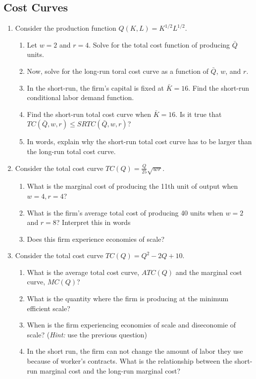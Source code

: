 \documentclass[11pt]{article}
\begin{document}
\subsection*{Cost Curves}
\begin{enumerate}
  \item Consider the production function $Q(K, L) = K^{1/2}L^{1/2}$.
  \begin{enumerate}
    \item Let $w = 2$ and $r = 4$. Solve for the total cost function of producing $\bar{Q}$ units.
    
    \item Now, solve for the long-run toral cost curve as a function of $\bar{Q}$, $w$, and $r$.
    
    \item In the short-run, the firm's capital is fixed at $\bar{K} = 16$. Find the short-run conditional labor demand function. 
    
    \item Find the short-run total cost curve when $\bar{K} = 16$. Is it true that $TC(\bar{Q}, w, r) \leq SRTC(\bar{Q}, w, r)$?
    
    \item In words, explain why the short-run total cost curve has to be larger than the long-run total cost curve.
  \end{enumerate} 

  \item Consider the total cost curve $TC(Q) = \frac{Q}{25} \sqrt{wr}$.
  \begin{enumerate}
    \item What is the marginal cost of producing the 11th unit of output when $w = 4, r = 4$?
    
    \item What is the firm's average total cost of producing 40 units when $w = 2$ and $r = 8$? Interpret this in words

    \item Does this firm experience economies of scale?
  \end{enumerate}

  \item Consider the total cost curve $TC(Q) = Q^2 - 2Q + 10$.
  \begin{enumerate}
    \item What is the average total cost curve, $ATC(Q)$ and the marginal cost curve, $MC(Q)$?
    
    \item What is the quantity where the firm is producing at the minimum efficient scale?
    
    \item When is the firm experiencing economies of scale and diseconomie of scale? (\emph{Hint:} use the previous question) 
    
    \item In the short run, the firm can not change the amount of labor they use because of worker's contracts. What is the relationship between the short-run marginal cost and the long-run marginal cost?
  \end{enumerate}
\end{enumerate}
\end{document}
